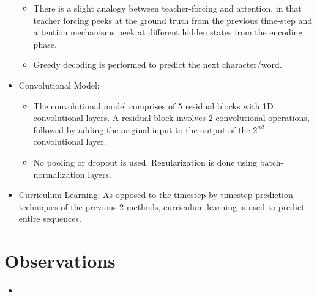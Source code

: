 \documentclass[12pt]{scrartcl}
\begin{document}
\begin{itemize}
\begin{itemize}
        \item There is a slight analogy between teacher-forcing and attention, in that teacher forcing peeks at the ground truth from the previous time-step and attention mechanisms peek at different hidden states from the encoding phase.
        \item Greedy decoding is performed to predict the next character/word.
      \end{itemize}
    \item Convolutional Model:
      \begin{itemize}
        \item The convolutional model comprises of 5 residual blocks with 1D convolutional layers. A residual block involves 2 convolutional operations, followed by adding the original input to the output of the $2^{nd}$ convolutional layer.
        \item No pooling or dropout is used. Regularization is done using batch-normalization layers.
      \end{itemize}
    \item Curriculum Learning: As opposed to the timestep by timestep prediction techniques of the previous 2 methods, curriculum learning is used to predict entire sequences. \cite{bengio2009curriculum}
  \end{itemize}

\section{Observations}
  \begin{itemize}
    \item 
  \end{itemize}



\end{document}
